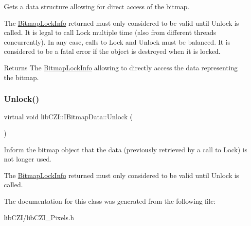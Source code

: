Gets a data structure allowing for direct access of the bitmap.

The \hyperlink{structlib_c_z_i_1_1_bitmap_lock_info}{Bitmap\+Lock\+Info} returned must only considered to be valid until Unlock is called. It is legal to call Lock multiple time (also from different threads concurrently). In any case, calls to Lock and Unlock must be balanced. It is considered to be a fatal error if the object is destroyed when it is locked.

\begin{DoxyReturn}{Returns}
The \hyperlink{structlib_c_z_i_1_1_bitmap_lock_info}{Bitmap\+Lock\+Info} allowing to directly access the data representing the bitmap. 
\end{DoxyReturn}
\mbox{\label{classlib_c_z_i_1_1_i_bitmap_data_a473c706c604fd687fb653bd06f0e0356}} 
\subsubsection{\texorpdfstring{Unlock()}{Unlock()}}
{\footnotesize\ttfamily virtual void lib\+C\+Z\+I\+::\+I\+Bitmap\+Data\+::\+Unlock (\begin{DoxyParamCaption}{ }\end{DoxyParamCaption})\hspace{0.3cm}{\ttfamily [pure virtual]}}

Inform the bitmap object that the data (previously retrieved by a call to Lock) is not longer used.

The \hyperlink{structlib_c_z_i_1_1_bitmap_lock_info}{Bitmap\+Lock\+Info} returned must only considered to be valid until Unlock is called. 

The documentation for this class was generated from the following file\+:\begin{DoxyCompactItemize}
\item 
lib\+C\+Z\+I/lib\+C\+Z\+I\+\_\+\+Pixels.\+h\end{DoxyCompactItemize}
